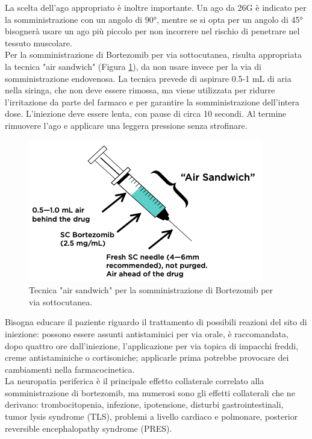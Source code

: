 La scelta dell’ago appropriato è inoltre importante. Un ago da 26G è indicato per la somministrazione con un angolo di
90°, mentre se si opta per un angolo di 45° bisognerà usare un ago più piccolo per non incorrere nel rischio di 
penetrare nel tessuto muscolare\cite{BORTNURSES}.\\
Per la somministrazione di Bortezomib per via sottocutanea, risulta appropriata la tecnica "air sandwich" 
(Figura \ref{fig:FIGURE_3.7}),
da non usare invece per la via di somministrazione endovenosa. La tecnica prevede di aspirare 0.5-1 mL 
di aria nella siringa, che non deve essere rimossa, ma viene utilizzata per ridurre l'irritazione da parte del farmaco e 
per garantire la somministrazione dell'intera dose. L'iniezione deve essere lenta, con pause di circa 10 secondi. 
Al termine rimuovere l'ago e applicare una leggera pressione senza strofinare\cite{BORTNURSES}.

\begin{figure}[H]
    \begin{center}
    \includegraphics[width=0.5\columnwidth]{img/SIRINGA.png}
    \vspace{-3mm}
    \end{center}
    \caption{ Tecnica "air sandwich" per la somministrazione di Bortezomib per via sottocutanea.
    \cite{BORTEZOMIB}}
    \label{fig:FIGURE_3.7}
\end{figure}

Bisogna educare il paziente riguardo il trattamento di possibili reazioni del sito di iniezione: 
possono essere assunti antistaminici per via orale, è raccomandata, dopo quattro ore dall’iniezione, 
l’applicazione per via topica di impacchi freddi, creme antistaminiche o cortisoniche;
applicarle prima potrebbe provocare dei cambiamenti nella farmacocinetica\cite{BORTEZOMIB}.\\
La neuropatia periferica è il principale effetto collaterale correlato alla somministrazione di bortezomib, 
ma numerosi sono gli effetti collaterali che ne derivano: trombocitopenia, infezione, ipotensione, disturbi 
gastrointestinali, tumor lysis syndrome (TLS), problemi a livello cardiaco e polmonare, posterior reversible 
encephalopathy syndrome (PRES)\cite{BORTNURSES}.

